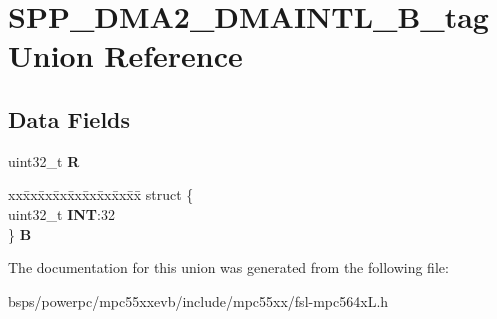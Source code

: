 \hypertarget{unionSPP__DMA2__DMAINTL__32B__tag}{}\section{S\+P\+P\+\_\+\+D\+M\+A2\+\_\+\+D\+M\+A\+I\+N\+T\+L\+\_\+B\+\_\+tag Union Reference}
\label{unionSPP__DMA2__DMAINTL__32B__tag}
\subsection*{Data Fields}
\begin{DoxyCompactItemize}
\item 
\mbox{\label{unionSPP__DMA2__DMAINTL__32B__tag_a89a19d59e3863cf1857efc9b0fcc28c4}} 
uint32\+\_\+t {\bfseries R}
\item 
\mbox{\label{unionSPP__DMA2__DMAINTL__32B__tag_a80fae3b80cc7bdd37b6e57a6289d873e}} 
\begin{tabbing}
xx\=xx\=xx\=xx\=xx\=xx\=xx\=xx\=xx\=\kill
struct \{\\
\>uint32\_t {\bfseries INT}:32\\
\} {\bfseries B}\\

\end{tabbing}\end{DoxyCompactItemize}


The documentation for this union was generated from the following file\+:\begin{DoxyCompactItemize}
\item 
bsps/powerpc/mpc55xxevb/include/mpc55xx/fsl-\/mpc564x\+L.\+h\end{DoxyCompactItemize}
